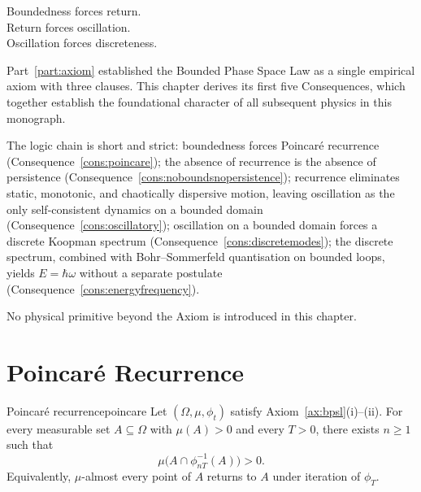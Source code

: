 
\epigraph{%
  Boundedness forces return.\\
  Return forces oscillation.\\
  Oscillation forces discreteness.%
}{}

\noindent
Part~\ref{part:axiom} established the Bounded Phase Space Law as a single
empirical axiom with three clauses.
This chapter derives its first five Consequences, which together establish
the foundational character of all subsequent physics in this monograph.

The logic chain is short and strict: boundedness forces Poincaré recurrence
(Consequence~\ref{cons:poincare}); the absence of recurrence is the absence
of persistence (Consequence~\ref{cons:noboundsnopersistence}); recurrence
eliminates static, monotonic, and chaotically dispersive motion, leaving
oscillation as the only self-consistent dynamics on a bounded domain
(Consequence~\ref{cons:oscillatory}); oscillation on a bounded domain
forces a discrete Koopman spectrum
(Consequence~\ref{cons:discretemodes}); the discrete spectrum, combined
with Bohr--Sommerfeld quantisation on bounded loops, yields $E=\hbar\omega$
without a separate postulate
(Consequence~\ref{cons:energyfrequency}).

No physical primitive beyond the Axiom is introduced in this chapter.

\section{Poincaré Recurrence}
\label{sec:ch3-poincare}

\begin{consequence}{Poincaré recurrence}{poincare}
Let $(\Omega,\mu,\phi_{t})$ satisfy Axiom~\ref{ax:bpsl}(i)--(ii).
For every measurable set $A\subseteq\Omega$ with $\mu(A)>0$ and every
$T>0$, there exists $n\ge 1$ such that
\begin{equation}
  \mu\bigl(A\cap\phi_{nT}^{-1}(A)\bigr)>0.
  \label{eq:recurrenceset}
\end{equation}
Equivalently, $\mu$-almost every point of $A$ returns to $A$ under
iteration of $\phi_{T}$.
\end{consequence}


